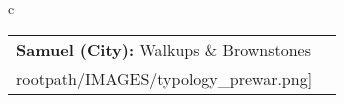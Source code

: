 \begin{table}[H]
        \begin{tabular}{c}
        \begin{tabular}{m{1.5in} m{2in}}
\textbf{Samuel (City):} {Walkups \& Brownstones} & \texttt{[image: \\rootpath/IMAGES/typology\_prewar.png]}
\end{tabular}\end{tabular}
        \end{table}